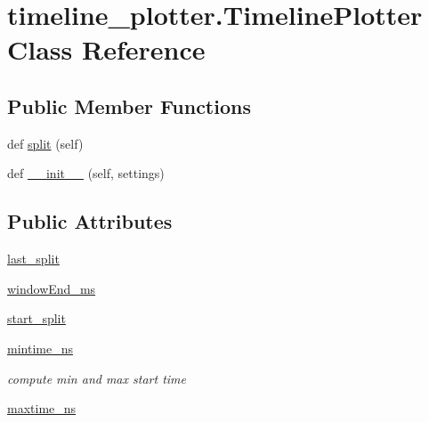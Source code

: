 \hypertarget{classtimeline__plotter_1_1TimelinePlotter}{}\section{timeline\+\_\+plotter.\+Timeline\+Plotter Class Reference}
\label{classtimeline__plotter_1_1TimelinePlotter}
\subsection*{Public Member Functions}
\begin{DoxyCompactItemize}
\item 
def \hyperlink{classtimeline__plotter_1_1TimelinePlotter_a5fcae0c7c8dd7cb3d07297e65011b9c5}{split} (self)
\item 
def \hyperlink{classtimeline__plotter_1_1TimelinePlotter_a81ec370d3bf241c2401501fb77c3cb32}{\+\_\+\+\_\+init\+\_\+\+\_\+} (self, settings)
\end{DoxyCompactItemize}
\subsection*{Public Attributes}
\begin{DoxyCompactItemize}
\item 
\hyperlink{classtimeline__plotter_1_1TimelinePlotter_a25e09d87f8c364d6de814dac0f9900dd}{last\+\_\+split}
\item 
\hyperlink{classtimeline__plotter_1_1TimelinePlotter_a06f482a99e861dbbf4ad58501d98f15f}{window\+End\+\_\+ms}
\item 
\hyperlink{classtimeline__plotter_1_1TimelinePlotter_a1f4b340c2fc2db403d689a959a3f7e43}{start\+\_\+split}
\item 
\hyperlink{classtimeline__plotter_1_1TimelinePlotter_a8a05446f08419e371588aad9c00e4feb}{mintime\+\_\+ns}
\begin{DoxyCompactList}\small\item\em compute min and max start time \end{DoxyCompactList}\item 
\hyperlink{classtimeline__plotter_1_1TimelinePlotter_ab040dfac5a70cf05d5493410ea7ad784}{maxtime\+\_\+ns}
\end{DoxyCompactItemize}
